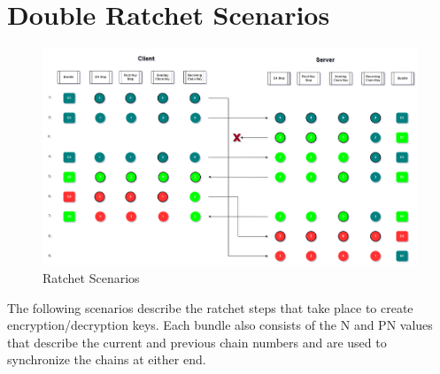 \section{Double Ratchet Scenarios}
\begin{figure}[ht!]
\centering
\includegraphics[width= 150mm]{./images/Ratchet Scenarios.png}
\caption{Ratchet Scenarios}
\end{figure}

The following scenarios describe the ratchet steps that take place to create encryption/decryption keys. Each bundle also consists of the N and PN values that describe the current and previous chain numbers and are used to synchronize the chains at either end.

